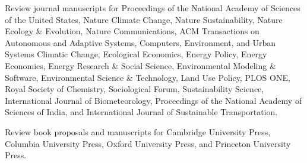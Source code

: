 \item[Ongoing] Review journal manuscripts for
  Proceedings of the National Academy of Sciences of the United States,
  Nature Climate Change,
  Nature Sustainability,
  Nature Ecology \& Evolution,
  Nature Communications,
  ACM Transactions on Autonomous and Adaptive Systems,
  Computers, Environment, and Urban Systems
  Climatic Change,
  Ecological Economics,
  Energy Policy,
  Energy Economics,
  Energy Research \& Social Science,
  Environmental Modeling \& Software,
  Environmental Science \& Technology,
  Land Use Policy,
  PLOS ONE,
  Royal Society of Chemistry,
  Sociological Forum,
  Sustainability Science,
  International Journal of Biometeorology,
  Proceedings of the National Academy of Sciences of India,
  and
  International Journal of Sustainable Transportation.
\item[Ongoing] Review book proposals and manuscripts for
  Cambridge University Press,
  Columbia University Press,
  Oxford University Press,
  and Princeton University Press.
